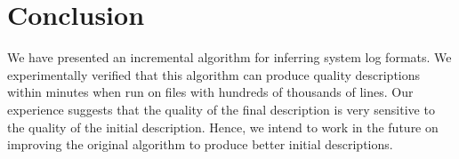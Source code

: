 \section{Conclusion}
\label{sec:conclude}
We have presented an incremental algorithm for inferring system log
formats.  We experimentally verified that this algorithm can produce
quality descriptions within minutes when run on files with hundreds of
thousands of lines.  Our experience suggests that the quality of
the final description is very sensitive to the quality of the initial
description.  Hence, we intend to work in the future on improving the
original algorithm to produce  better initial descriptions. 



 


